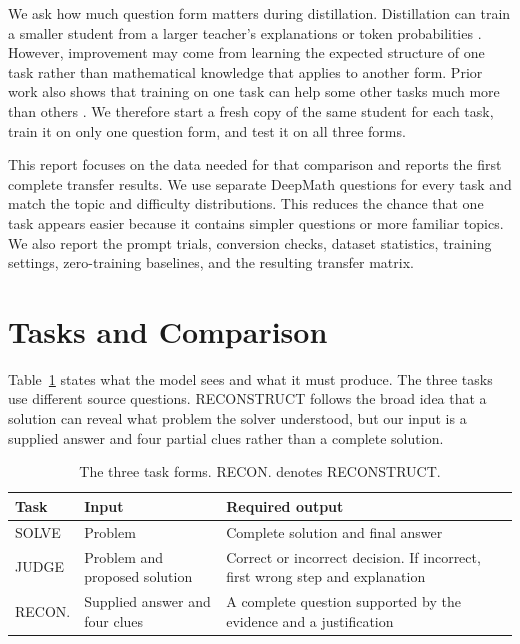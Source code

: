\documentclass[11pt]{article}
\begin{document}
We ask how much question form matters during distillation. Distillation can train a smaller student from a larger teacher's explanations or token probabilities \citep{hsieh2023distilling,agarwal2024opd}. However, improvement may come from learning the expected structure of one task rather than mathematical knowledge that applies to another form. Prior work also shows that training on one task can help some other tasks much more than others \citep{krishna2025latent}. We therefore start a fresh copy of the same student for each task, train it on only one question form, and test it on all three forms.

This report focuses on the data needed for that comparison and reports the first complete transfer results. We use separate DeepMath questions for every task and match the topic and difficulty distributions. This reduces the chance that one task appears easier because it contains simpler questions or more familiar topics. We also report the prompt trials, conversion checks, dataset statistics, training settings, zero-training baselines, and the resulting transfer matrix.

\section{Tasks and Comparison}

Table~\ref{tab:tasks} states what the model sees and what it must produce. The three tasks use different source questions. RECONSTRUCT follows the broad idea that a solution can reveal what problem the solver understood, but our input is a supplied answer and four partial clues rather than a complete solution.

\begin{table}[t]
\centering
\small
\begin{tabular}{p{}p{}p{}}
\toprule
Task & Input & Required output \\
\midrule
SOLVE & Problem & Complete solution and final answer \\
JUDGE & Problem and proposed solution & Correct or incorrect decision. If incorrect, first wrong step and explanation \\
RECON. & Supplied answer and four clues & A complete question supported by the evidence and a justification \\
\bottomrule
\end{tabular}
\caption{The three task forms. RECON. denotes RECONSTRUCT.}
\label{tab:tasks}
\end{table}
\end{document}
